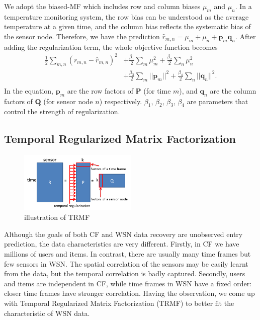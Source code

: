 We adopt the biased-MF which includes row and column biases $\mu_m$ and $\mu_n$. %
In a temperature monitoring system, the row bias can be understood as the average temperature at a given time, and the column bias reflects the systematic bias of the sensor node.
Therefore, we have the prediction $\hat{r}_{m,n} = \mu_m + \mu_n + \mathbf{p}_m \mathbf{q}_n$.
After adding the regularization term, the whole objective function becomes
\begin{equation*}\begin{aligned}
\frac{1}{2}\sum_{m,n}{(r_{m,n} - \hat{r}_{m,n})}^2 & + \frac{\beta_1}{2}\sum_m{\mu_m^2} + \frac{\beta_2}{2}\sum_n{\mu_n^2}\\
& + \frac{\beta_3}{2}\sum_m{||\mathbf{p}_m||^2} + \frac{\beta_4}{2}\sum_n{||\mathbf{q}_n||^2}.\\
\end{aligned}\end{equation*}
In the equation, $\mathbf{p}_m$ are the row factors of $\mathbf{P}$ (for time $m$), and $\mathbf{q}_n$ are the column factors of $\mathbf{Q}$ (for sensor node $n$) respectively.
$\beta_1$, $\beta_2$, $\beta_3$, $\beta_4$ are parameters that control the strength of regularization.

\subsection{Temporal Regularized Matrix Factorization}

\begin{figure}[htbp]
	\centering
	\includegraphics[width=0.5\textwidth]{TRMF_illustration.png}
	\caption{illustration of TRMF}
\end{figure}


Although the goals of both CF and WSN data recovery are unobserved entry prediction, the data characteristics are very different.
Firstly, in CF we have millions of users and items.
In contrast, there are usually many time frames but few sensors in WSN.
The spatial correlation of the sensors may be easily learnt from the data, but the temporal correlation is badly captured.
Secondly, users and items are independent in CF, while time frames in WSN have a fixed order: closer time frames have stronger correlation.
Having the observation, we come up with Temporal Regularized Matrix Factorization (TRMF) to better fit the characteristic of WSN data. 

